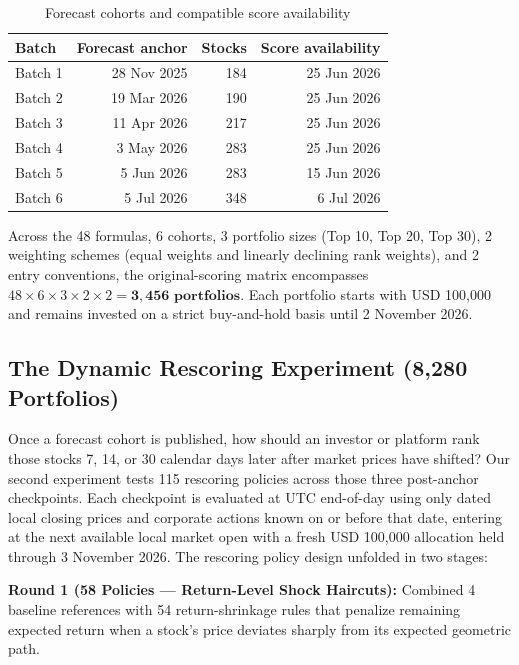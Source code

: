 \documentclass[11pt,a4paper]{article}
\numberwithin{table}{section}
\begin{document}
\begin{minipage}{\linewidth}
\begin{center}\small\setlength{\tabcolsep}{3pt}\renewcommand{\arraystretch}{1.18}
\begin{longtable}{@{}lrrr@{}}
\caption{Forecast cohorts and compatible score availability}\\
\toprule
Batch & Forecast anchor & Stocks & Score availability\\\midrule\endhead
Batch 1 & 28 Nov 2025 & 184 & 25 Jun 2026\\
Batch 2 & 19 Mar 2026 & 190 & 25 Jun 2026\\
Batch 3 & 11 Apr 2026 & 217 & 25 Jun 2026\\
Batch 4 & 3 May 2026 & 283 & 25 Jun 2026\\
Batch 5 & 5 Jun 2026 & 283 & 15 Jun 2026\\
Batch 6 & 5 Jul 2026 & 348 & 6 Jul 2026\\
\bottomrule\end{longtable}\end{center}
\end{minipage}\par
Across the 48 formulas, 6 cohorts, 3 portfolio sizes (Top 10, Top 20, Top 30), 2 weighting schemes (equal weights and linearly declining rank weights), and 2 entry conventions, the original-scoring matrix encompasses $48 \times 6 \times 3 \times 2 \times 2 = \mathbf{3,456\text{ portfolios}}$. Each portfolio starts with USD 100,000 and remains invested on a strict buy-and-hold basis until 2 November 2026.

\subsection{The Dynamic Rescoring Experiment (8,280 Portfolios)}

Once a forecast cohort is published, how should an investor or platform rank those stocks 7, 14, or 30 calendar days later after market prices have shifted? Our second experiment tests 115 rescoring policies across those three post-anchor checkpoints. Each checkpoint is evaluated at UTC end-of-day using only dated local closing prices and corporate actions known on or before that date, entering at the next available local market open with a fresh USD 100,000 allocation held through 3 November 2026. The rescoring policy design unfolded in two stages:

\textbf{Round 1 (58 Policies --- Return-Level Shock Haircuts):}  Combined 4 baseline references with 54 return-shrinkage rules that penalize remaining expected return when a stock's price deviates sharply from its expected geometric path.
\end{document}
